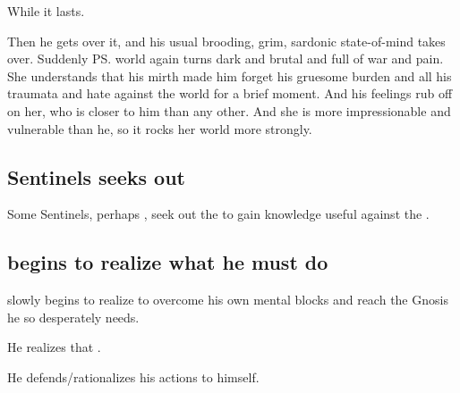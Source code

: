 \begin{garbage}
While it lasts. 

Then he gets over it, and his usual brooding, grim, sardonic state-of-mind takes over. 
Suddenly \ps{\Criseis} world again turns dark and brutal and full of war and pain.
She understands that his mirth made him forget his gruesome burden and all his traumata and hate against the world for a brief moment. 
And his feelings rub off on her, who is closer to him than any other. 
And she is more impressionable and vulnerable than he, so it rocks her world more strongly. 





\subsection{Sentinels seeks out \voyagers}
Some Sentinels, perhaps \Ishnaruchaefir, seek out the  to gain knowledge useful against the \banes. 








\subsection{\Ishnaruchaefir{} begins to realize what he must do}
\Ishnaruchaefir{} slowly begins to realize  to overcome his own mental blocks and reach the Gnosis he so desperately needs. 


He realizes that . 


He defends/rationalizes his actions to himself. 


\end{garbage}

